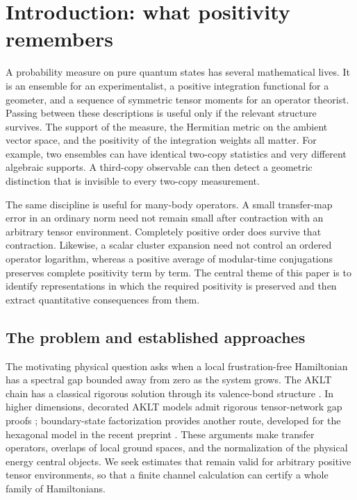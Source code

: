 \section{Introduction: what positivity remembers}
\label{sec:introduction}

A probability measure on pure quantum states has several mathematical lives.
It is an ensemble for an experimentalist, a positive integration functional
for a geometer, and a sequence of symmetric tensor moments for an operator
theorist. Passing between these descriptions is useful only if the relevant
structure survives. The support of the measure, the Hermitian metric on the
ambient vector space, and the positivity of the integration weights all matter.
For example, two ensembles can have identical two-copy statistics and very
different algebraic supports. A third-copy observable can then detect a
geometric distinction that is invisible to every two-copy measurement.

The same discipline is useful for many-body operators. A small transfer-map
error in an ordinary norm need not remain small after contraction with an
arbitrary tensor environment. Completely positive order does survive that
contraction. Likewise, a scalar cluster expansion need not control an ordered
operator logarithm, whereas a positive average of modular-time conjugations
preserves complete positivity term by term. The central theme of this paper is
to identify representations in which the required positivity is preserved and
then extract quantitative consequences from them.

\subsection{The problem and established approaches}

The motivating physical question asks when a local frustration-free
Hamiltonian has a spectral gap bounded away from zero as the system grows.
The AKLT chain has a classical rigorous solution through its valence-bond
structure \citep{q:AKLT1988}. In higher dimensions, decorated AKLT models
admit rigorous tensor-network gap proofs
\citep{q:ARLLNY2020,LuciaYoung2023}; boundary-state factorization provides
another route, developed for the hexagonal model in the recent preprint
\citet{Kastoryano2026}. These arguments make transfer operators, overlaps
of local ground spaces, and the normalization of the physical energy
central objects. We seek estimates that remain valid for arbitrary
positive tensor environments, so that a finite channel calculation can
certify a whole family of Hamiltonians.

